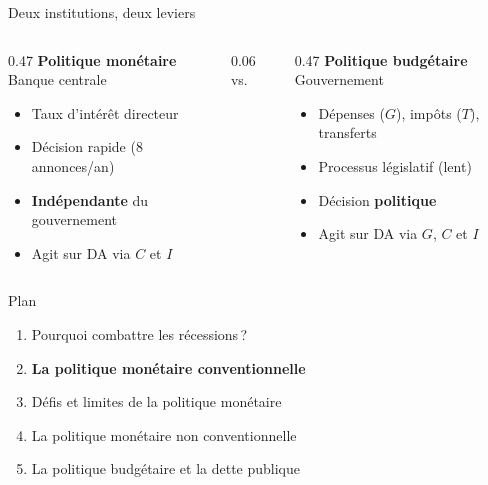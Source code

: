 \documentclass[aspectratio=169]{beamer}
\begin{document}
\begin{frame}[t]{Deux institutions, deux leviers}\examtag
   \vspace{0.3cm}
   \begin{columns}[T]
      \begin{column}{0.47\textwidth}
         \centering
         \textcolor{HECnavy}{\large\textbf{Politique monétaire}}\\[3pt]
         \textcolor{HECgray}{Banque centrale}\\[8pt]
         \small
         \begin{itemize}
            \setlength\itemsep{0.15cm}
            \item Taux d'intérêt directeur
            \item Décision rapide (8 annonces/an)
            \item \textbf{Indépendante} du gouvernement
            \item Agit sur DA via $C$ et $I$
         \end{itemize}
      \end{column}
      \begin{column}{0.06\textwidth}
         \centering
         \vspace{0.8cm}
         {\Large\textcolor{HECgray}{vs.\,}}
      \end{column}
      \begin{column}{0.47\textwidth}
         \centering
         \textcolor{HECgreen}{\large\textbf{Politique budgétaire}}\\[3pt]
         \textcolor{HECgray}{Gouvernement}\\[8pt]
         \small
         \begin{itemize}
            \setlength\itemsep{0.15cm}
            \item Dépenses ($G$), impôts ($T$), transferts
            \item Processus législatif (lent)
            \item Décision \textbf{politique}
            \item Agit sur DA via $G$, $C$ et $I$
         \end{itemize}
      \end{column}
   \end{columns}
\end{frame}


\begin{frame}{Plan}
   \begin{enumerate}
      \setlength\itemsep{0.5cm}
      \item {\color{gray!50}Pourquoi combattre les récessions\,?}
      \item \textbf{La politique monétaire conventionnelle}
      \item Défis et limites de la politique monétaire
      \item La politique monétaire non conventionnelle
      \item La politique budgétaire et la dette publique
   \end{enumerate}
\end{frame}
\end{document}
